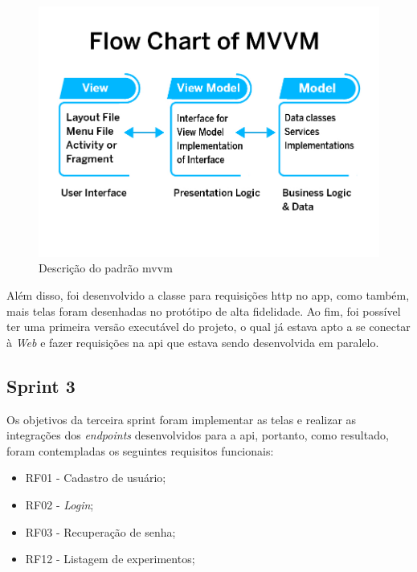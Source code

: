 \begin{figure}[H]
\centering
  \includegraphics[width=\columnwidth/2]{images/MVVM-architecture.jpg}
  \caption{Descrição do padrão \ac{mvvm}}
  \label{fig:MVVM-architecture}
\end{figure}

Além disso, foi desenvolvido a classe para requisições \ac{http} no \ac{app}, como também, mais telas foram desenhadas no protótipo de alta fidelidade. Ao fim, foi possível ter uma primeira versão executável do projeto, o qual já estava apto a se conectar à \textit{Web} e fazer requisições na \ac{api} que estava sendo desenvolvida em paralelo. 

\subsection{Sprint 3}\label{ssec:sprint3}
Os objetivos da terceira sprint foram implementar as telas e realizar as integrações dos \textit{endpoints} desenvolvidos para a \ac{api}, portanto, como resultado, foram contempladas os seguintes requisitos funcionais:
\begin{itemize}
   \item RF01 - Cadastro de usuário;
   \item RF02 - \textit{Login};
   \item RF03 - Recuperação de senha;
   \item RF12 - Listagem de experimentos;
 \end{itemize}

